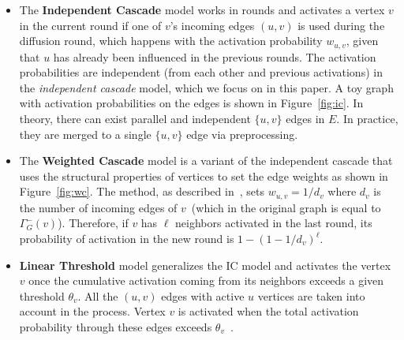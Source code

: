 \documentclass[review]{elsarticle}
\newcommand\kktodo[1]{\textcolor{red}{#1}}
\begin{document}
\begin{itemize}[leftmargin=*]
\item The {\bf Independent Cascade} model works in rounds and activates a vertex $v$ in the current round if one of $v$'s incoming edges $(u, v)$ is used during the diffusion round, which happens with the activation probability $w_{u, v}$, given that $u$ has already been influenced in the previous rounds. The activation probabilities are independent (from each other and previous activations) in the {\em independent cascade} model, which we focus on in this paper. A toy graph with activation probabilities on the edges is shown in Figure~\ref{fig:ic}.
In theory, there can exist parallel and independent $\{u, v\}$ edges in $E$. In practice, they are merged to a single $\{u,v\}$ edge via preprocessing. 

\item The {\bf Weighted Cascade}  model is a variant of the independent cascade that uses the structural properties of vertices to set the edge weights as shown in Figure~\ref{fig:wc}.
The method, as described in~\cite{kempe2003maximizing}, sets $w_{u, v} = 1 / d_v$ where $d_v$ is the number 
of incoming edges of $v$~(which in the original graph is equal to $\Gamma^-_G(v)$).
Therefore, if $v$ has $\ell$ neighbors activated in the last round, its probability of activation in the new round is $1-( 1-1 / d_v)^\ell$. 


\item{\bf Linear Threshold} model generalizes the IC model and activates the vertex $v$ once the cumulative activation coming from its neighbors exceeds a given threshold $\theta_v$. 
All the $(u, v)$ edges with active $u$ vertices are taken into account in the process. Vertex $v$ is activated when the total activation probability through these edges exceeds $\theta_v$~\cite{kempe2003maximizing}.  
\end{itemize}
\end{document}
